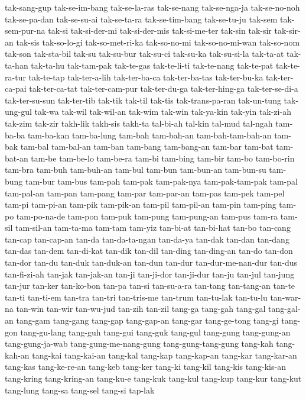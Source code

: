 {tak-sang-gup tak-se-im-bang tak-se-la-ras tak-se-nang tak-se-nga-ja
tak-se-no-noh tak-se-pa-dan tak-se-su-ai tak-se-ta-ra tak-se-tim-bang
tak-se-tu-ju tak-sem tak-sem-pur-na tak-si tak-si-der-mi tak-si-der-mis
tak-si-me-ter tak-sin tak-sir tak-sir-an tak-sis tak-so-lo-gi
tak-so-met-ri-ka tak-so-no-mi tak-so-no-mi-wan tak-so-nom tak-son
tak-sta-bil tak-su tak-su-bur tak-su-ci tak-su-ka tak-su-si-la tak-ta-at
tak-ta-han tak-ta-hu tak-tam-pak tak-te-gas tak-te-li-ti tak-te-nang
tak-te-pat tak-te-ra-tur tak-te-tap tak-ter-a-lih tak-ter-ba-ca
tak-ter-ba-tas tak-ter-bu-ka tak-ter-ca-pai tak-ter-ca-tat tak-ter-cam-pur
tak-ter-du-ga tak-ter-hing-ga tak-ter-se-di-a tak-ter-su-sun tak-ter-tib
tak-tik tak-til tak-tis tak-trans-pa-ran tak-un-tung tak-ung-gul tak-wa
tak-wil tak-wil-an tak-wim tak-win tak-ya-kin tak-yin tak-zi-ah tak-zim
tak-zir takh-lik takh-sis takh-ta tal-bi-ah tal-kin tal-mud tal-ngah
tam-ba-ba tam-ba-kan tam-ba-lung tam-bah tam-bah-an tam-bah-tam-bah-an
tam-bak tam-bal tam-bal-an tam-ban tam-bang tam-bang-an tam-bar tam-bat
tam-bat-an tam-be tam-be-lo tam-be-ra tam-bi tam-bing tam-bir tam-bo
tam-bo-rin tam-bra tam-buh tam-buh-an tam-bul tam-bun tam-bun-an
tam-bun-su tam-bung tam-bur tam-bus tam-pah tam-pak tam-pak-nya
tam-pak-tam-pak tam-pal tam-pal-an tam-pan tam-pang tam-par tam-par-an
tam-pas tam-pek tam-pel tam-pi tam-pi-an tam-pik tam-pik-an tam-pil
tam-pil-an tam-pin tam-ping tam-po tam-po-na-de tam-pon tam-puk tam-pung
tam-pung-an tam-pus tam-ra tam-sil tam-sil-an tam-ta-ma tam-tam tam-yiz
tan-bi-at tan-bi-hat tan-bo tan-cang tan-cap tan-cap-an tan-da
tan-da-ta-ngan tan-da-ya tan-dak tan-dan tan-dang tan-das tan-dem
tan-di-kat tan-dik tan-dil tan-ding tan-ding-an tan-do tan-don tan-dor
tan-du tan-duk tan-duk-an tan-dun tan-dur tan-dur-me-nan-dur tan-dus
tan-fi-zi-ah tan-jak tan-jak-an tan-ji tan-ji-dor tan-ji-dur tan-ju
tan-jul tan-jung tan-jur tan-ker tan-ko-bon tan-pa tan-si tan-su-a-ra
tan-tang tan-tang-an tan-te tan-ti tan-ti-em tan-tra tan-tri tan-tris-me
tan-trum tan-tu-lak tan-tu-lu tan-war-na tan-win tan-wir tan-wu-jud
tan-zih tan-zil tang-ga tang-gah tang-gal tang-gal-an tang-gam tang-gang
tang-gap tang-gap-an tang-gar tang-ge-tong tang-gi tang-gon tang-gu-lang
tang-guh tang-gui tang-guk tang-gul tang-gung tang-gung-an
tang-gung-ja-wab tang-gung-me-nang-gung tang-gung-tang-gung tang-kah
tang-kah-an tang-kai tang-kai-an tang-kal tang-kap tang-kap-an tang-kar
tang-kar-an tang-kas tang-ke-re-an tang-keb tang-ker tang-ki tang-kil
tang-kis tang-kis-an tang-kring tang-kring-an tang-ku-e tang-kuk tang-kul
tang-kup tang-kur tang-kut tang-lung tang-sa tang-sel tang-si tap-lak
}
